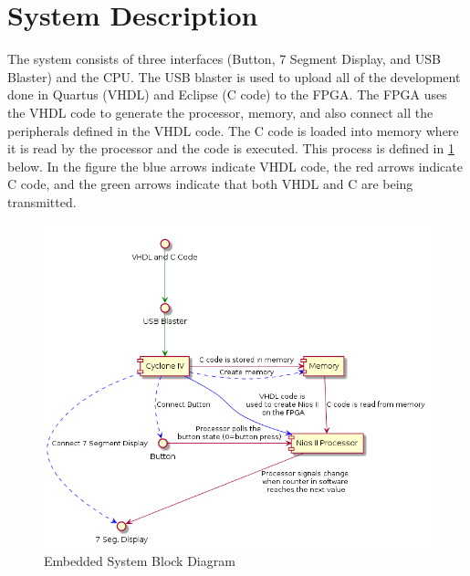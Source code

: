 \documentclass[10pt,a4paper]{article}
\begin{document}
	\section{System Description}
	The system consists of three interfaces (Button, 7 Segment Display, and USB Blaster) and the CPU. The USB blaster is used to upload all of the development done in Quartus (VHDL) and Eclipse (C code) to the FPGA. The FPGA uses the VHDL code to generate the processor, memory, and also connect all the peripherals defined in the VHDL code. The C code is loaded into memory where it is read by the processor and the code is executed. This process is defined in \ref{block} below. In the figure the blue arrows indicate VHDL code, the red arrows indicate C code, and the green arrows indicate that both VHDL and C are being transmitted.  
	\begin{figure}[H]
		\centering\includegraphics[width=15cm]{HW1_Block.png}
		\caption{Embedded System Block Diagram}
		\label{block}
	\end{figure}
\end{document}
